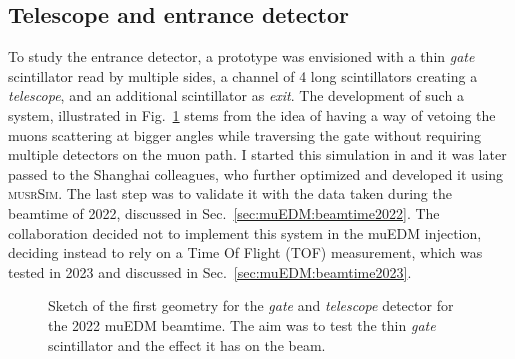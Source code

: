 \begin{refsection}
    \subsection{Telescope and entrance detector}
        To study the entrance detector, a prototype was envisioned with a thin \textit{gate} scintillator read by multiple sides, a channel of 4 long scintillators creating a \textit{telescope}, and an additional scintillator as \textit{exit}.
        The development of such a system, illustrated in Fig.~\ref{fig:muEDM:entrance:sketches} stems from the idea of having a way of vetoing the muons scattering at bigger angles while traversing the gate without requiring multiple detectors on the muon path.
        I started this simulation in \gf and it was later passed to the Shanghai colleagues, who further optimized and developed it using \textsc{musrSim}.
        The last step was to validate it with the data taken during the beamtime of 2022, discussed in Sec.~\ref{sec:muEDM:beamtime2022}.
        The collaboration decided not to implement this system in the muEDM injection, deciding instead to rely on a Time Of Flight (TOF) measurement, which was tested in 2023 and discussed in Sec.~\ref{sec:muEDM:beamtime2023}.
        \begin{figure}   
            \centering
            \hfill
            \caption[muEDM: sketch if the \textit{telescope}]{Sketch of the first geometry for the \textit{gate} and \textit{telescope} detector for the 2022 muEDM beamtime. The aim was to test the thin \textit{gate} scintillator and the effect it has on the beam.}
            \label{fig:muEDM:entrance:sketches}
        \end{figure}
        

\end{refsection}
